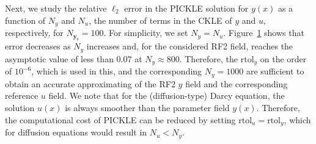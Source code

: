 \documentclass{agujournal2019}
\renewcommand{\caption}[2][]{\ignorespaces}
\begin{document}
\begin{figure}[!htbp]
    \centering
    \caption{Relative $\ell_2$ errors versus the number of KL terms.}
    \label{fig:rel_errors_vs_kl}
\end{figure}
\begin{comment}
\begin{figure}[!htbp]
    \centering
    \texttt{[image: pickle-hanford-paper/figures/Fig\_L2\_vs\_KL.pdf]}
    \caption{Relative $\ell_2$ errors versus the number of KL terms.}
    \label{fig:rel_errors_vs_kl}
\end{figure}
\end{comment}
Next, we study the relative $\ell_2$ error in the PICKLE solution for $y(x)$ as a function of $N_y$ and $N_u$, the number of terms in the CKLE of $y$ and $u$, respectively, for $N_{\mathbf{y}_{\mathrm{s}}} = 100$.
For simplicity, we set $N_y=N_u$.
Figure~\ref{fig:rel_errors_vs_kl} shows that error decreases as $N_y$ increases and, for the considered RF2 field, reaches the asymptotic value of less than 0.07 at $N_y \approx 800$.
Therefore, the $\text{rtol}_y$ on the order of $10^{-6}$, which is used in this, and the corresponding $N_y=1000$ are  sufficient to obtain an accurate approximating of the RF2 $y$ field and the corresponding reference $u$ field. We note that for the (diffusion-type) Darcy equation, the solution $u(x)$ is always smoother than the parameter field $y(x)$. Therefore, the computational cost of PICKLE can be reduced  by setting $\text{rtol}_u = \text{rtol}_y$, which for diffusion equations would result in $N_u < N_y$. 
\end{document}
